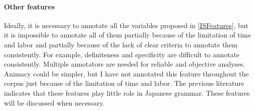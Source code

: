

\paragraph{Other features}

Ideally, it is necessary to annotate all the variables proposed in \ref{ISFeatures},
but it is impossible to annotate all of them
partially because of the limitation of time and labor and 
partially because of the lack of clear criteria to annotate them consistently.
For example, definiteness and specificity are difficult to annotate consistently.
Multiple annotators are needed for reliable and objective analyses.
Animacy could be simpler, but I have not annotated this feature throughout the corpus just because of the limitation of time and labor.
The previous literature indicates that
these features play little role in Japanese grammar.
These features will be discussed when necessary.


